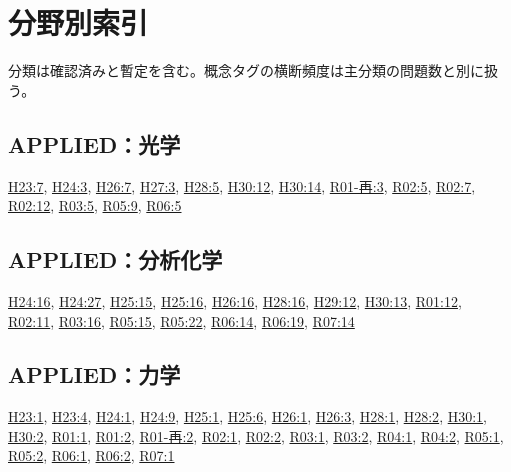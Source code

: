 \chapter{分野別索引}
分類は確認済みと暫定を含む。概念タグの横断頻度は主分類の問題数と別に扱う。
\section{APPLIED：光学}
\hyperref[q:h23-reg-applied-07]{H23:7}, \hyperref[q:h24-reg-applied-03]{H24:3}, \hyperref[q:h26-reg-applied-07]{H26:7}, \hyperref[q:h27-reg-applied-03]{H27:3}, \hyperref[q:h28-reg-applied-05]{H28:5}, \hyperref[q:h30-reg-applied-12]{H30:12}, \hyperref[q:h30-reg-applied-14]{H30:14}, \hyperref[q:r01-ret-applied-03]{R01-再:3}, \hyperref[q:r02-reg-applied-05]{R02:5}, \hyperref[q:r02-reg-applied-07]{R02:7}, \hyperref[q:r02-reg-applied-12]{R02:12}, \hyperref[q:r03-reg-applied-05]{R03:5}, \hyperref[q:r05-reg-applied-09]{R05:9}, \hyperref[q:r06-reg-applied-05]{R06:5}
\section{APPLIED：分析化学}
\hyperref[q:h24-reg-applied-16]{H24:16}, \hyperref[q:h24-reg-applied-27]{H24:27}, \hyperref[q:h25-reg-applied-15]{H25:15}, \hyperref[q:h25-reg-applied-16]{H25:16}, \hyperref[q:h26-reg-applied-16]{H26:16}, \hyperref[q:h28-reg-applied-16]{H28:16}, \hyperref[q:h29-reg-applied-12]{H29:12}, \hyperref[q:h30-reg-applied-13]{H30:13}, \hyperref[q:r01-reg-applied-12]{R01:12}, \hyperref[q:r02-reg-applied-11]{R02:11}, \hyperref[q:r03-reg-applied-16]{R03:16}, \hyperref[q:r05-reg-applied-15]{R05:15}, \hyperref[q:r05-reg-applied-22]{R05:22}, \hyperref[q:r06-reg-applied-14]{R06:14}, \hyperref[q:r06-reg-applied-19]{R06:19}, \hyperref[q:r07-reg-applied-14]{R07:14}
\section{APPLIED：力学}
\hyperref[q:h23-reg-applied-01]{H23:1}, \hyperref[q:h23-reg-applied-04]{H23:4}, \hyperref[q:h24-reg-applied-01]{H24:1}, \hyperref[q:h24-reg-applied-09]{H24:9}, \hyperref[q:h25-reg-applied-01]{H25:1}, \hyperref[q:h25-reg-applied-06]{H25:6}, \hyperref[q:h26-reg-applied-01]{H26:1}, \hyperref[q:h26-reg-applied-03]{H26:3}, \hyperref[q:h28-reg-applied-01]{H28:1}, \hyperref[q:h28-reg-applied-02]{H28:2}, \hyperref[q:h30-reg-applied-01]{H30:1}, \hyperref[q:h30-reg-applied-02]{H30:2}, \hyperref[q:r01-reg-applied-01]{R01:1}, \hyperref[q:r01-reg-applied-02]{R01:2}, \hyperref[q:r01-ret-applied-02]{R01-再:2}, \hyperref[q:r02-reg-applied-01]{R02:1}, \hyperref[q:r02-reg-applied-02]{R02:2}, \hyperref[q:r03-reg-applied-01]{R03:1}, \hyperref[q:r03-reg-applied-02]{R03:2}, \hyperref[q:r04-reg-applied-01]{R04:1}, \hyperref[q:r04-reg-applied-02]{R04:2}, \hyperref[q:r05-reg-applied-01]{R05:1}, \hyperref[q:r05-reg-applied-02]{R05:2}, \hyperref[q:r06-reg-applied-01]{R06:1}, \hyperref[q:r06-reg-applied-02]{R06:2}, \hyperref[q:r07-reg-applied-01]{R07:1}
